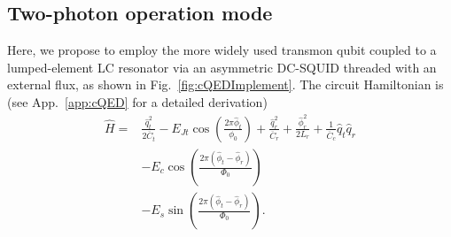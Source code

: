 {\subsection{Two-photon operation mode}}
Here, we propose to employ the more widely used transmon qubit \cite{TransmonPaper} coupled to a lumped-element LC resonator via an asymmetric DC-SQUID threaded with an external flux, as shown in Fig.~\ref{fig:cQEDImplement}. The circuit Hamiltonian is (see App.~\ref{app:cQED} for a detailed derivation)
\begin{align}\label{eq:cQEDHam}
    \hat{H}=&\frac{\hat{q}_t^2}{2 \overline{C}_t}- E_{Jt}\cos(\frac{2\pi \hat{\phi}_t}{\phi_0}) + \frac{\hat{q}_r^2}{\overline{C}_r}+\frac{\hat{\phi}_r^2}{2 L_r} +\frac{1}{\overline{C}_c}\hat{q}_t \hat{q}_r\nonumber\\& - E_{c}\cos(\frac{2\pi ( \hat{\phi}_t-\hat{\phi}_r)}{\Phi_0})\nonumber\\  &-E_{s}\sin(\frac{2\pi ( \hat{\phi}_t-\hat{\phi}_r)}{\Phi_0}).
\end{align}

